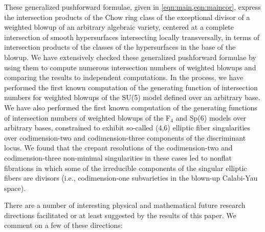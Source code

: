 \documentclass[11pt,oneside,english]{article}
\numberwithin{equation}{section}
\theoremstyle{definition}
\begin{document}
These generalized pushforward formulae, given in \cref{eqn:main,eqn:maincor}, express the intersection products of the Chow ring class of the exceptional divisor of a weighted blowup of an arbitrary algebraic variety, centered at a complete intersection of smooth hypersurfaces intersecting locally transversally, in terms of intersection products of the classes of the hypersurfaces in the base of the blowup. We have extensively checked these generalized pushforward formulae by using them to compute numerous intersection numbers of weighted blowups and comparing the results to independent computations. In the process, we have performed the first known computation of the generating function of intersection numbers for weighted blowups of the SU(5) model defined over an arbitrary base. We have also performed the first known computation of the generating functions of intersection numbers of weighted blowups of the F$_4$ and Sp(6) models over arbitrary bases, constrained to exhibit so-called (4,6) elliptic fiber singularities over codimension-two and codimension-three components of the discriminant locus. We found that the crepant resolutions of the codimension-two and codimension-three non-minimal singularities in these cases led to nonflat fibrations in which some of the irreducible components of the singular elliptic fibers are divisors (i.e., codimension-one subvarieties in the blown-up Calabi-Yau space).

There are a number of interesting physical and mathematical future research directions facilitated or at least suggested by the results of this paper. We comment on a few of these directions:
\end{document}
